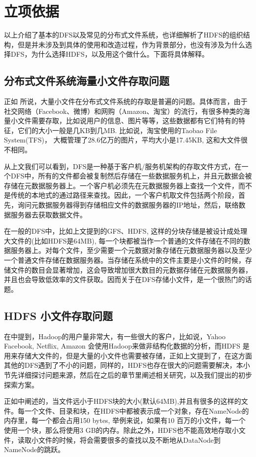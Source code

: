 \documentclass[UTF8]{ctexart}
\begin{document}
\section{立项依据}
以上介绍了基本的DFS以及常见的分布式文件系统，也详细解析了HDFS的组织结构，但是并未涉及到具体的使用和改造过程，作为背景部分，也没有涉及为什么选择DFS，为什么选择HDFS，以及用这个做什么。下面将具体解释。

\subsection{分布式文件系统海量小文件存取问题}
正如 \cite{Songling} 所说，大量小文件在分布式文件系统的存取是普遍的问题。具体而言，由于社交网络（Facebook、微博）和网购（Amazon、淘宝）的流行，有很多种类的海量小文件需要存取，比如说用户的信息、图片等等，这些数据都有它们特有的特征，它们的大小一般是几KB到几MB. 比如说，淘宝使用的Taobao File System(TFS)， 大概管理了28.6亿万的图片，平均大小是17.45KB, 这和大文件很不相同。

从上文我们可以看到，DFS是一种基于客户机/服务机架构的存取文件方式，在一个DFS中，所有的文件都会被复制然后存储在一些数据服务机上，并且元数据会被存储在元数据服务器上。一个客户机必须先在元数据服务器上查找一个文件，而不是传统的本地式的通过路径来查找。因此，一个客户机取文件包括两个阶段，首先，询问元数据服务器得到存储相应文件的数据服务器的IP地址，然后，联络数据服务器去获取数据文件。

在一般的DFS中，比如上文提到的GFS、HDFS, 这样的分块存储是被设计成处理大文件的(比如HDFS是64MB), 每一个块都被当作一个普通的文件存储在不同的数据服务器上。对每个文件，至少需要一个元数据对象存储在元数据服务器以及至少一个普通文件存储在数据服务器。当存储在系统中的文件主要是小文件的时候，存储文件的数目会显著增加，这会导致增加很大数目的元数据存储在元数据服务器，并且也会导致低效率的文件获取。因而关于在DFS存储小文件，是一个很热门的话题。

\subsection{HDFS 小文件存取问题}
在\cite{Sachin}中提到，Hadoop的用户量非常大，有一些很大的客户，比如说，Yahoo Facebook, Netflix, Amazon 会使用Hadoop来做非结构化数据的分析，而HDFS 是用来存储大文件的，但是大量的小文件也需要被存储，正如上文提到了，在这方面其他的DFS遇到了不小的问题，同样的，HDFS也存在很大的问题需要解决，本小节先详细探讨问题来源，然后在之后的章节里阐述相关研究，以及我们提出的初步探索方案。

正如\cite{Xiaojun}中阐述的，当文件远小于HDFS块的大小(默认64MB),并且有很多的这样的文件。每一个文件、目录和块，在HDFS中都被表示成一个对象，存在NameNode的内存里，每一个都会占用150 bytes, 举例来说，如果有10 百万的小文件，每一个使用一个块，那么将使用3 GB的内存。除此之外，HDFS也不能高效地存取小文件，读取小文件的时候，将会需要很多的查找以及不断地从DataNode到NameNode的跳跃。
\end{document}
